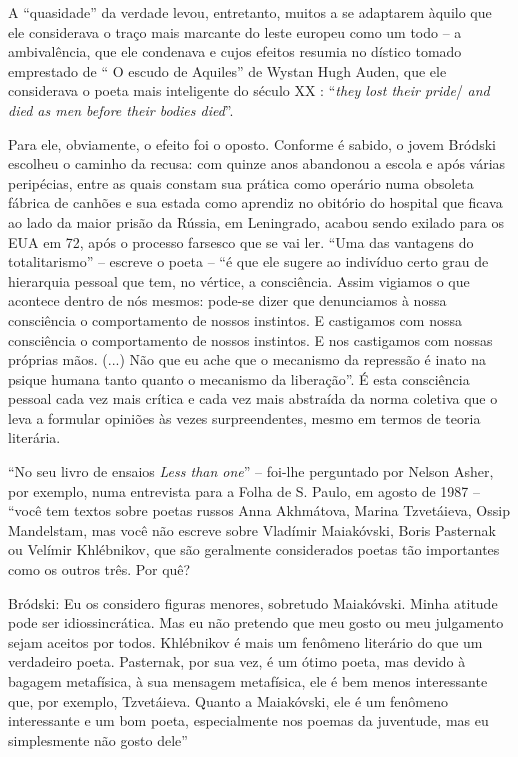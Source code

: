 A ``quasidade'' da verdade levou, entretanto, muitos a se adaptarem
àquilo que ele considerava o traço mais marcante do leste europeu como
um todo -- a ambivalência, que ele condenava e cujos efeitos resumia no
dístico tomado emprestado de `` O escudo de Aquiles'' de Wystan Hugh
Auden, que ele considerava o poeta mais inteligente do século XX :
``\emph{they lost their pride}/ \emph{and died as men before their
bodies died}''.

Para ele, obviamente, o efeito foi o oposto. Conforme é sabido, o jovem
Bródski escolheu o caminho da recusa: com quinze anos abandonou a escola
e após várias peripécias, entre as quais constam sua prática como
operário numa obsoleta fábrica de canhões e sua estada como aprendiz no
obitório do hospital que ficava ao lado da maior prisão da Rússia, em
Leningrado, acabou sendo exilado para os EUA em 72, após o processo
farsesco que se vai ler. ``Uma das vantagens do totalitarismo'' --
escreve o poeta -- ``é que ele sugere ao indivíduo certo grau de
hierarquia pessoal que tem, no vértice, a consciência. Assim vigiamos o
que acontece dentro de nós mesmos: pode-se dizer que denunciamos à nossa
consciência o comportamento de nossos instintos. E castigamos com nossa
consciência o comportamento de nossos instintos. E nos castigamos com
nossas próprias mãos. (...) Não que eu ache que o mecanismo da repressão
é inato na psique humana tanto quanto o mecanismo da liberação''. É esta
consciência pessoal cada vez mais crítica e cada vez mais abstraída da
norma coletiva que o leva a formular opiniões às vezes surpreendentes,
mesmo em termos de teoria literária.

``No seu livro de ensaios \emph{Less than one}'' -- foi-lhe perguntado
por Nelson Asher, por exemplo, numa entrevista para a Folha de S. Paulo,
em agosto de 1987 -- ``você tem textos sobre poetas russos Anna
Akhmátova, Marina Tzvetáieva, Ossip Mandelstam, mas você não escreve
sobre Vladímir Maiakóvski, Boris Pasternak ou Velímir Khlébnikov, que
são geralmente considerados poetas tão importantes como os outros três.
Por quê?

Bródski: Eu os considero figuras menores, sobretudo Maiakóvski. Minha
atitude pode ser idiossincrática. Mas eu não pretendo que meu gosto ou
meu julgamento sejam aceitos por todos. Khlébnikov é mais um fenômeno
literário do que um verdadeiro poeta. Pasternak, por sua vez, é um ótimo
poeta, mas devido à bagagem metafísica, à sua mensagem metafísica, ele é
bem menos interessante que, por exemplo, Tzvetáieva. Quanto a
Maiakóvski, ele é um fenômeno interessante e um bom poeta, especialmente
nos poemas da juventude, mas eu simplesmente não gosto dele''

